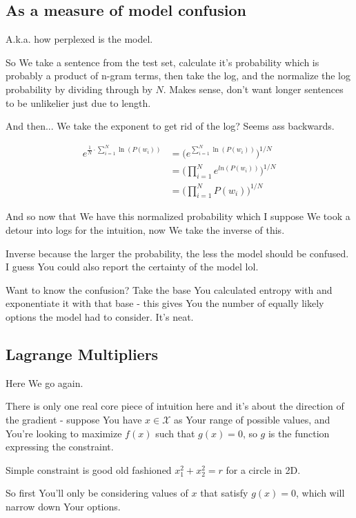 \documentclass{article}
\begin{document}
		\subsection{As a measure of model confusion}
		
			A.k.a. how perplexed is the model.
			
			So We take a sentence from the test set, calculate it's probability which is probably a product of n-gram terms, then take the log, and the normalize the log probability by dividing through by $N$. Makes sense, don't want longer sentences to be unlikelier just due to length.
			
			And then... We take the exponent to get rid of the log? Seems ass backwards.
			
			\begin{align}
				e^{\frac{1}{N}\cdot\sum^N_{i=1}\ln(P(w_i))} &= \big(e^{\sum^N_{i=1}\ln(P(w_i))}\big)^{1/N}\\
				&= \bigg(\prod^N_{i=1} e^{ln(P(w_i))}\bigg)^{1/N}\\
				&= \bigg(\prod^N_{i=1} P(w_i)\bigg)^{1/N}
			\end{align}
			
			And so now that We have this normalized probability which I suppose We took a detour into logs for the intuition, now We take the inverse of this.
			
			Inverse because the larger the probability, the less the model should be confused. I guess You could also report the certainty of the model lol.
			
			Want to know the confusion? Take the base You calculated entropy with and exponentiate it with that base - this gives You the number of equally likely options the model had to consider. It's neat.
			
			
	\subsection{Lagrange Multipliers}
	
		Here We go again.
		
		There is only one real core piece of intuition here and it's about the direction of the gradient - suppose You have $x\in\mathcal{X}$ as Your range of possible values, and You're looking to maximize $f(x)$ such that $g(x) = 0$, so $g$ is the function expressing the constraint.
		
		Simple constraint is good old fashioned $x_1^2+x_2^2=r$ for a circle in 2D.
		
		So first You'll only be considering values of $x$ that satisfy $g(x)=0$, which will narrow down Your options.
		
\end{document}
